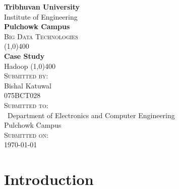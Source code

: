 \documentclass[12pt]{article}
\begin{document}
\begin{titlepage}
    \begin{center}
        \huge{\bfseries  Tribhuvan University}\\
        \Large{Institute of Engineering}\\
        \huge{ \bfseries  Pulchowk Campus}\\[3.2cm]


        \textsc{\Large Big Data Technologies}\\[-0.5cm]
        \line(1,0){400}\\
        \huge{\bfseries Case Study}\\
        \large{Hadoop}
        \line(1,0){400}\\


        \textsc{\Large Submitted by:}\\
        \Large Bishal Katuwal\\ \large 075BCT028\\    [0.85cm]

        \textsc{\Large Submitted to:}\\\
        \large Department of Electronics and Computer Engineering\\Pulchowk Campus\\    [0.85cm]
        
        \textsc{\Large Submitted on:}\\
        \today
        
    \end{center}
\end{titlepage}
\pagebreak
\tableofcontents
\pagebreak
\listoffigures
\pagebreak
\section{Introduction}
\end{document}
